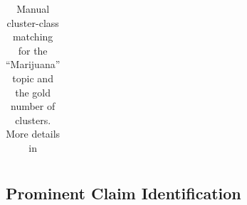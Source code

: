 \documentclass{beamer}
\begin{document}
\begin{frame}
\begin{table}[ht]
{\begin{center}
\begin{tabular}{lp{1cm}p{3cm}|lp{1cm}p{3cm}}
 \\
\bottomrule
\end{tabular}
\caption{Manual cluster-class matching for the ``Marijuana'' topic and the gold
number of clusters. More details in \cite{boltuzic2015identifying}}
\label{tab:cluster-class}
\end{center}}
\end{table}
\end{frame}


\subsection{Prominent Claim Identification}
\end{document}
